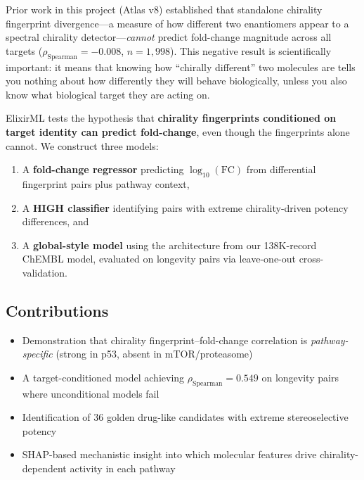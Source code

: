 \documentclass[11pt,a4paper]{article}
\newcommand{\FC}{\text{FC}}
\newcommand{\logFC}{\log_{10}(\FC)}
\newcommand{\rhosp}{\rho_{\text{Spearman}}}
\begin{document}
Prior work in this project (Atlas v8) established that standalone chirality
fingerprint divergence---a measure of how different two enantiomers appear
to a spectral chirality detector---\emph{cannot} predict fold-change
magnitude across all targets ($\rhosp = -0.008$, $n = 1{,}998$). This
negative result is scientifically important: it means that knowing how
``chirally different'' two molecules are tells you nothing about how
differently they will behave biologically, unless you also know what
biological target they are acting on.

ElixirML tests the hypothesis that \textbf{chirality fingerprints conditioned
on target identity can predict fold-change}, even though the fingerprints
alone cannot. We construct three models:
\begin{enumerate}[nosep]
    \item A \textbf{fold-change regressor} predicting $\logFC$ from
          differential fingerprint pairs plus pathway context,
    \item A \textbf{HIGH classifier} identifying pairs with extreme
          chirality-driven potency differences, and
    \item A \textbf{global-style model} using the architecture from our
          138K-record ChEMBL model, evaluated on longevity pairs via
          leave-one-out cross-validation.
\end{enumerate}

\subsection{Contributions}

\begin{itemize}[nosep]
    \item Demonstration that chirality fingerprint--fold-change correlation
          is \emph{pathway-specific} (strong in p53, absent in mTOR/proteasome)
    \item A target-conditioned model achieving $\rhosp = 0.549$ on
          longevity pairs where unconditional models fail
    \item Identification of 36 golden drug-like candidates with
          extreme stereoselective potency
    \item SHAP-based mechanistic insight into which molecular features
          drive chirality-dependent activity in each pathway
\end{itemize}

\end{document}
